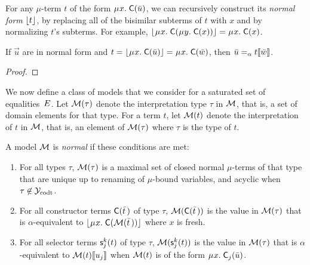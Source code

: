 For any $\mu$-term $t$ of the form $\MU x.\; \const C( \vec u )$, we can
recursively construct its \emph{normal form} $\lfloor t\rfloor$,
by replacing all of the bisimilar subterms of $t$ with $x$
and by normalizing $t$'s subterms.
For example, $\nf{\MU x.\; \const{C}( \MU y.\; \const{C}( x ) )} = \MU x.\; \const{C}( x )$.

\begin{lemma}
\label{lem:mu-norm-arg}
If $\vec u$ are in normal form and $t = \nf{\MU x.\; \const{C}( \vec u )} = \MU x.\; \const{C}( \vec w )$,
then $\bar u \mathrel{=_\alpha} t\llbracket \bar w \rrbracket$.
\end{lemma}
\begin{proof}
\end{proof}


We now define a class of models that we consider for a saturated set of equalities~$E$.
Let $\mathcal{M}( \tau )$ denote the interpretation type $\tau$ in $\mathcal{M}$,
that is, a set of domain elements for that type.
For a term $t$, let $\mathcal{M}( t )$ denote the interpretation of $t$ in $\mathcal{M}$,
that is, an element of $\mathcal{M}( \tau )$ where $\tau$ is the type of $t$.

\begin{definition}
\afterDot%
\label{def:norm-model}%
\rm
A model $\mathcal{M}$ is \emph{normal} if these conditions are met:
\begin{enumerate}
\item
For all types $\tau$,
$\mathcal{M}( \tau )$ is a maximal set of closed normal $\mu$-terms of that type that are
unique up to renaming of $\mu$-bound variables,
and acyclic when $\tau \not\in \mathcal{Y}_{\mathrm{codt}}$.
\item
For all constructor terms $\textsf{C}( \bar t \,)$ of type $\tau$,
$\mathcal{M}( \textsf{C}( \bar t \,) )$ is the value
in $\mathcal{M}( \tau )$ that is $\alpha$-equivalent to
$\nf{\MU x.\; \const{C}( \M( \vec t \,) )}$ where $x$ is fresh.
\item
For all selector terms $\textsf{s}^k_j( t )$ of type $\tau$, %
$\mathcal{M}( \textsf{s}^k_j( t ) )$ is the value
in $\mathcal{M}( \tau )$ that is $\alpha$-equivalent to
$\mathcal{M}( t )\llbracket u_j \rrbracket$
when $\mathcal{M}( t )$ is of the form $\MU x.\; \const{C}_j( \vec u )$.
\end{enumerate}
\end{definition}

